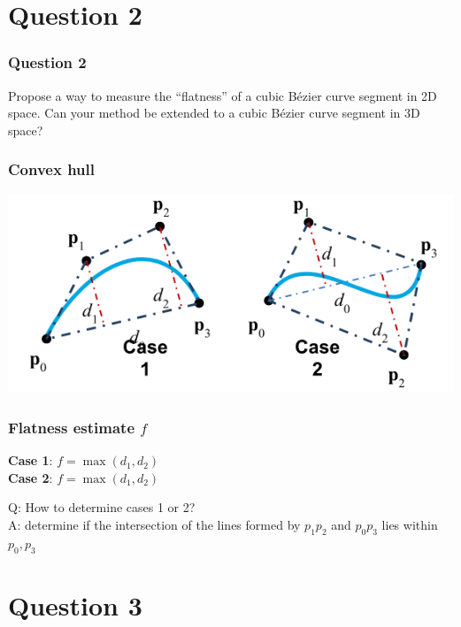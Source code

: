 \documentclass{beamer}
\begin{document}
\section{Question 2}

\begin{frame}
    \frametitle{Question 2}
    Propose a way to measure the “flatness” of a cubic Bézier curve segment in 2D space. 
    Can your method be extended to a cubic Bézier curve segment in 3D space?
\end{frame}

\begin{frame}
    \frametitle{Convex hull}

    \begin{center}
        \includegraphics[]{q2-types-of-curves.png}
    \end{center}

\end{frame}

\begin{frame}
    \frametitle{Flatness estimate $f$}

    \begin{center}
        \textbf{Case 1}: $f = \max(d_1, d_2)$\\
        \textbf{Case 2}: $f = \max(d_1, d_2)$
    \end{center}

    \begin{tcolorbox}
        Q: How to determine cases 1 or 2?\\
        A: determine if the intersection of the lines formed by $p_1 p_2$ and 
        $p_0 p_3$ lies within $p_0, p_3$
    \end{tcolorbox}

\end{frame}

\section{Question 3}
\end{document}
